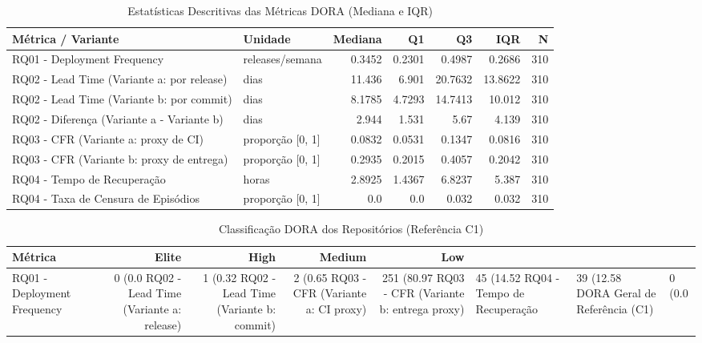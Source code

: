 
\begin{table}[htbp]
\centering
\caption{Estatísticas Descritivas das Métricas DORA (Mediana e IQR)}
\label{tab:metricas_descritivas_rq01_rq04}
\begin{tabular}{|l|l|r|r|r|r|r|}
\hline
\textbf{Métrica / Variante} & \textbf{Unidade} & \textbf{Mediana} & \textbf{Q1} & \textbf{Q3} & \textbf{IQR} & \textbf{N} \\
\hline
RQ01 - Deployment Frequency & releases/semana & 0.3452 & 0.2301 & 0.4987 & 0.2686 & 310 \\
RQ02 - Lead Time (Variante a: por release) & dias & 11.436 & 6.901 & 20.7632 & 13.8622 & 310 \\
RQ02 - Lead Time (Variante b: por commit) & dias & 8.1785 & 4.7293 & 14.7413 & 10.012 & 310 \\
RQ02 - Diferença (Variante a - Variante b) & dias & 2.944 & 1.531 & 5.67 & 4.139 & 310 \\
RQ03 - CFR (Variante a: proxy de CI) & proporção [0, 1] & 0.0832 & 0.0531 & 0.1347 & 0.0816 & 310 \\
RQ03 - CFR (Variante b: proxy de entrega) & proporção [0, 1] & 0.2935 & 0.2015 & 0.4057 & 0.2042 & 310 \\
RQ04 - Tempo de Recuperação & horas & 2.8925 & 1.4367 & 6.8237 & 5.387 & 310 \\
RQ04 - Taxa de Censura de Episódios & proporção [0, 1] & 0.0 & 0.0 & 0.032 & 0.032 & 310 \\
\hline
\end{tabular}
\end{table}

\begin{table}[htbp]
\centering
\caption{Classificação DORA dos Repositórios (Referência C1)}
\label{tab:classificacao_dora_c1}
\begin{tabular}{|l|r|r|r|r|}
\hline
\textbf{Métrica} & \textbf{Elite} & \textbf{High} & \textbf{Medium} & \textbf{Low} \\
\hline
RQ01 - Deployment Frequency & 0 (0.0%
RQ02 - Lead Time (Variante a: release) & 1 (0.32%
RQ02 - Lead Time (Variante b: commit) & 2 (0.65%
RQ03 - CFR (Variante a: CI proxy) & 251 (80.97%
RQ03 - CFR (Variante b: entrega proxy) & 45 (14.52%
RQ04 - Tempo de Recuperação & 39 (12.58%
DORA Geral de Referência (C1) & 0 (0.0%
\hline
\end{tabular}
\end{table}
